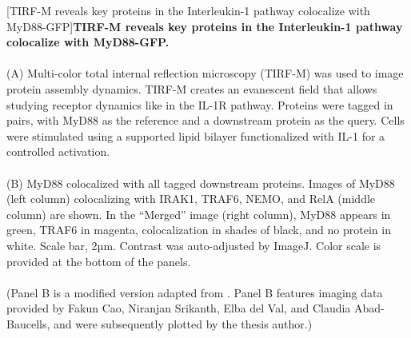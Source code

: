 \begin{centering}
\captionsetup{parbox=none}
[TIRF-M reveals key proteins in the Interleukin-1 pathway colocalize with MyD88-GFP]{\textbf{TIRF-M reveals key proteins in the Interleukin-1 pathway colocalize with MyD88-GFP.}
\\
\\
(A) Multi-color total internal reflection microscopy (TIRF-M) was used to image protein assembly dynamics. TIRF-M creates an evanescent field that allows studying receptor dynamics like in the IL-1R pathway. Proteins were tagged in pairs, with MyD88 as the reference and a downstream protein as the query. Cells were stimulated using a supported lipid bilayer functionalized with IL-1 for a controlled activation.
\\
\\
(B) MyD88 colocalized with all tagged downstream proteins. Images of MyD88 (left column) colocalizing with IRAK1, TRAF6, NEMO, and RelA (middle column) are shown. In the “Merged” image (right column), MyD88 appears in green, TRAF6 in magenta, colocalization in shades of black, and no protein in white. Scale bar, 2µm. Contrast was auto-adjusted by ImageJ. Color scale is provided at the bottom of the panels.
\\
\\
(Panel B is a modified version adapted from \autocite{Taylor_2017}. Panel B features imaging data provided by Fakun Cao, Niranjan Srikanth, Elba del Val, and Claudia Abad-Baucells, and were subsequently plotted by the thesis author.)}
\label{p2:system}
\end{centering}


